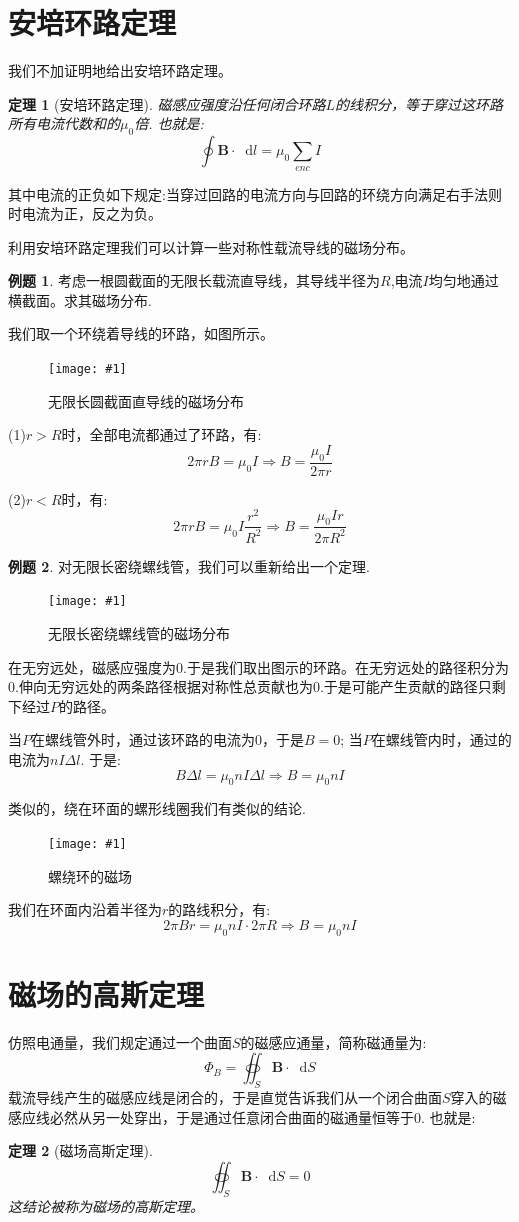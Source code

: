 \documentclass[12pt,a4paper,oneside]{report}
\newtheorem{theorem}{定理}[chapter]
\theoremstyle{definition}
\newtheorem{example}{例题}[chapter]
\theoremstyle{remark}
\newcommand{\insertfig}[3]{
    \begin{figure}[ht]
        \centering
        \texttt{[image: \#1]}
        \caption{#2}
        \label{fig:#1}
    \end{figure}
}
\renewcommand{\d}{\mathop{}\!\mathrm{d}}
\begin{document}
\section{安培环路定理}

我们不加证明地给出安培环路定理。
\begin{theorem}[安培环路定理]

磁感应强度沿任何闭合环路$L$的线积分，等于穿过这环路所有电流代数和的$\mu_0$倍. 也就是: 
\[
\oint \mathbf{B} \cdot \d l = \mu_0 \sum_{enc} I
\]

\end{theorem}

其中电流的正负如下规定:当穿过回路的电流方向与回路的环绕方向满足右手法则时电流为正，反之为负。

利用安培环路定理我们可以计算一些对称性载流导线的磁场分布。

\begin{example}
考虑一根圆截面的无限长载流直导线，其导线半径为$R$,电流$I$均匀地通过横截面。求其磁场分布.

我们取一个环绕着导线的环路，如图所示。
\insertfig{2-6.png}{无限长圆截面直导线的磁场分布}{0.2}

(1)$r>R$时，全部电流都通过了环路，有:
\[
2\pi r B = \mu_0 I\Rightarrow B = \frac{\mu_0 I}{2\pi r}
\]

(2)$r<R$时，有:
\[
2\pi r B = \mu_0 I \frac{r^2}{R^2} \Rightarrow B = \frac{\mu_0 Ir}{2\pi R^2}
\]
\end{example}

\begin{example}
对无限长密绕螺线管，我们可以重新给出一个定理.
\insertfig{2-7.png}{无限长密绕螺线管的磁场分布}{0.25}

在无穷远处，磁感应强度为$0$.于是我们取出图示的环路。在无穷远处的路径积分为$0$.伸向无穷远处的两条路径根据对称性总贡献也为$0$.于是可能产生贡献的路径只剩下经过$P$的路径。

当$P$在螺线管外时，通过该环路的电流为0，于是$B=0$; 当$P$在螺线管内时，通过的电流为$nI\Delta l$. 于是:
\[
B \Delta l = \mu_0 n I \Delta l \Rightarrow B = \mu_0 nI
\]

类似的，绕在环面的螺形线圈我们有类似的结论.

\insertfig{2-8.png}{螺绕环的磁场}{0.25}

我们在环面内沿着半径为$r$的路线积分，有:\[
2\pi Br =\mu_0 n I \cdot 2\pi R \Rightarrow B = \mu_0 nI
\]

\end{example}

\section{磁场的高斯定理}
仿照电通量，我们规定通过一个曲面$S$的磁感应通量，简称磁通量为:
\[
\Phi_B= \oiint_S \mathbf{B}\cdot \d S
\]
载流导线产生的磁感应线是闭合的，于是直觉告诉我们从一个闭合曲面$S$穿入的磁感应线必然从另一处穿出，于是通过任意闭合曲面的磁通量恒等于$0$. 也就是:
\begin{theorem}[磁场高斯定理]
  

\[
\oiint_S \mathbf{B}\cdot \d S =0
\]
这结论被称为磁场的高斯定理。
\end{theorem}
\end{document}

